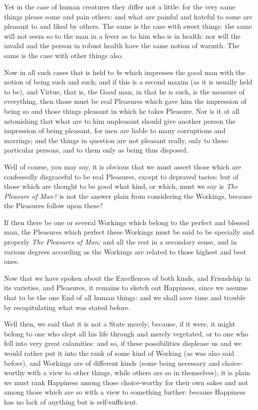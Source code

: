 Yet in the case of human creatures they differ not a little: for the very same
things please some and pain others: and what are painful and hateful to some
are pleasant to and liked by others. The same is the case with sweet things:
the same will not seem so to the man in a fever as to him who is in health: nor
will the invalid and the person in robust health have the same notion of
warmth. The same is the case with other things also.

Now in all such cases that is held to \emph{be} which impresses the good man
with the notion of being such and such; and if this is a second maxim (as it is
usually held to be), and Virtue, that is, the Good man, in that he is such, is
the measure of everything, then those must be real Pleasures which gave him the
impression of being so and those things pleasant in which he takes Pleasure.
Nor is it at all astonishing that what are to him unpleasant should give
another person the impression of being pleasant, for men are liable to many
corruptions and marrings; and the things in question are not pleasant really,
only to these particular persons, and to them only as being thus disposed.

Well of course, you may say, it is obvious that we must assert those which are
confessedly disgraceful to be real Pleasures, except to depraved tastes: but of
those which are thought to be good what kind, or which, must we say is \emph{The
Pleasure of Man?} is not the answer plain from considering the Workings,
because the Pleasures follow upon these?

If then there be one or several Workings which belong to the perfect and
blessed man, the Pleasures which perfect these Workings must be said to be
specially and properly \emph{The Pleasures of Man;} and all the rest in a
secondary sense, and in various degrees according as the Workings are related
to those highest and best ones.


Now that we have spoken about the Excellences of both kinds, and Friendship in
its varieties, and Pleasures, it remains to sketch out Happiness, since we
assume that to be the one End of all human things: and we shall save time and
trouble by recapitulating what was stated before.

Well then, we said that it is not a State merely; because, if it were, it might
belong to one who slept all his life through and merely vegetated, or to one
who fell into very great calamities: and so, if these possibilities displease
us and we would rather put it into the rank of some kind of Working (as was
also said before), and Workings are of different kinds (some being necessary
and choice-worthy with a view to other things, while others are so in
themselves), it is plain we must rank Happiness among those choice-worthy for
their own sakes and not among those which are so with a view to something
further: because Happiness has no lack of anything but is self-sufficient.

